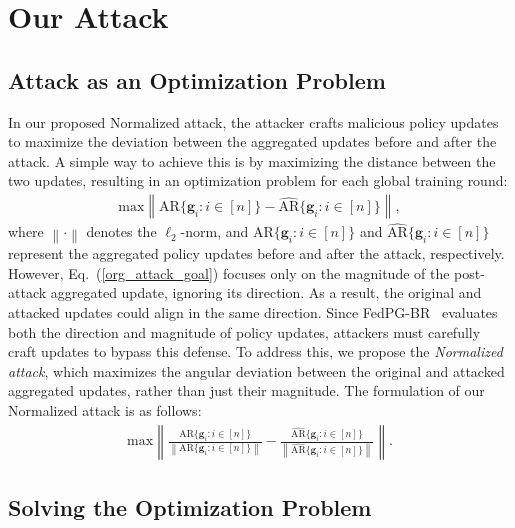 

\section{Our Attack}\label{section:our_attack}



\subsection{Attack as an Optimization Problem}
\label{sec_4.2}
%
In our proposed Normalized attack, the attacker crafts malicious policy updates to maximize the deviation between the aggregated updates before and after the attack. A simple way to achieve this is by maximizing the distance between the two updates, resulting in an optimization problem for each global training round:
%
\begin{align}
\label{org_attack_goal}
\text{max}  \left\| \text{AR} \{ \bm{g}_i: i \in [n]\} - \widehat{\text{AR}} \{ \bm{g}_i: i \in [n]\} \right\|,
\end{align}
where \(\left\| \cdot \right\|\) denotes the \(\ell_2\)-norm, and \(\text{AR} \{ \bm{g}_i: i \in [n]\}\) and \(\widehat{\text{AR}} \{ \bm{g}_i: i \in [n]\}\) represent the aggregated policy updates before and after the attack, respectively.
%
%
However, Eq.~(\ref{org_attack_goal}) focuses only on the magnitude of the post-attack aggregated update, ignoring its direction. As a result, the original and attacked updates could align in the same direction. Since FedPG-BR~\cite{fan2021fault} evaluates both the direction and magnitude of policy updates, attackers must carefully craft updates to bypass this defense. 
%
To address this, we propose the \emph{Normalized attack}, which maximizes the angular deviation between the original and attacked aggregated updates, rather than just their magnitude. The formulation of our Normalized attack is as follows:
\begin{align}
\label{our_attack_goal}
\text{max}  \left\| \frac{{\text{AR}} \{ \bm{g}_i: i \in [n]\} }{\left\|{\text{AR}} \{ \bm{g}_i: i \in [n]\} \right\|} - \frac{\widehat{\text{AR}} \{ \bm{g}_i: i \in [n]\} }{\left\| \widehat{\text{AR}} \{ \bm{g}_i: i \in [n]\}  \right\|} \right\|.
\end{align}



\subsection{Solving the Optimization Problem} 

